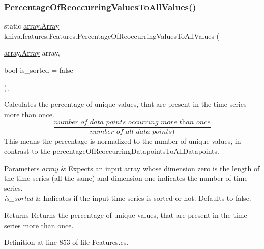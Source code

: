 \subsubsection{\texorpdfstring{Percentage\+Of\+Reoccurring\+Values\+To\+All\+Values()}{PercentageOfReoccurringValuesToAllValues()}}
{\footnotesize\ttfamily static \mbox{\hyperlink{classkhiva_1_1array_1_1_array}{array.\+Array}} khiva.\+features.\+Features.\+Percentage\+Of\+Reoccurring\+Values\+To\+All\+Values (\begin{DoxyParamCaption}\item[{\mbox{\hyperlink{classkhiva_1_1array_1_1_array}{array.\+Array}}}]{array,  }\item[{bool}]{is\+\_\+sorted = {\ttfamily false} }\end{DoxyParamCaption})\hspace{0.3cm}{\ttfamily [inline]}, {\ttfamily [static]}}



Calculates the percentage of unique values, that are present in the time series more than once. \[ \frac{\textit{number of data points occurring more than once}}{\textit{number of all data points})} \] This means the percentage is normalized to the number of unique values, in contrast to the percentage\+Of\+Reoccurring\+Datapoints\+To\+All\+Datapoints. 


\begin{DoxyParams}{Parameters}
{\em array} & Expects an input array whose dimension zero is the length of the time series (all the same) and dimension one indicates the number of time series.\\
\hline
{\em is\+\_\+sorted} & Indicates if the input time series is sorted or not. Defaults to false.\\
\hline
\end{DoxyParams}
\begin{DoxyReturn}{Returns}
Returns the percentage of unique values, that are present in the time series more than once.
\end{DoxyReturn}


Definition at line 853 of file Features.\+cs.

\mbox{\label{classkhiva_1_1features_1_1_features_a2fa1e072e11ee66d5a990e8693453baf}} 
